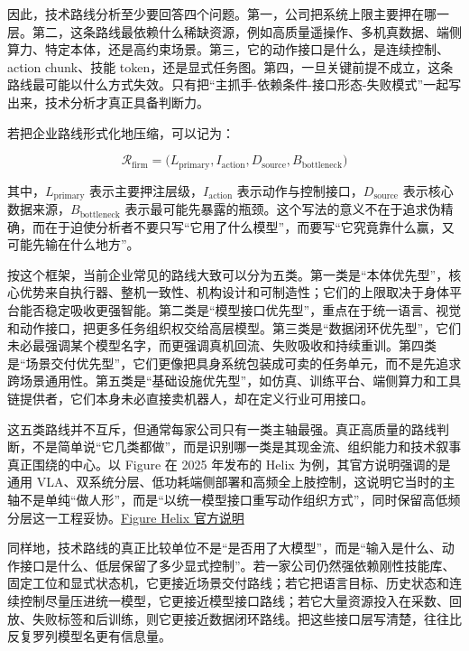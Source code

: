 因此，技术路线分析至少要回答四个问题。第一，公司把系统上限主要押在哪一层。第二，这条路线最依赖什么稀缺资源，例如高质量遥操作、多机真数据、端侧算力、特定本体，还是高约束场景。第三，它的动作接口是什么，是连续控制、action chunk、技能 token，还是显式任务图。第四，一旦关键前提不成立，这条路线最可能以什么方式失效。只有把“主抓手-依赖条件-接口形态-失败模式”一起写出来，技术分析才真正具备判断力。

若把企业路线形式化地压缩，可以记为：

\begingroup
\scriptsize
\begin{equation*}
\mathcal{R}_{\text{firm}} = \bigl(L_{\text{primary}}, I_{\text{action}}, D_{\text{source}}, B_{\text{bottleneck}}\bigr)
\end{equation*}
\endgroup

其中，\(L_{\text{primary}}\) 表示主要押注层级，\(I_{\text{action}}\) 表示动作与控制接口，\(D_{\text{source}}\) 表示核心数据来源，\(B_{\text{bottleneck}}\) 表示最可能先暴露的瓶颈。这个写法的意义不在于追求伪精确，而在于迫使分析者不要只写“它用了什么模型”，而要写“它究竟靠什么赢，又可能先输在什么地方”。

按这个框架，当前企业常见的路线大致可以分为五类。第一类是“本体优先型”，核心优势来自执行器、整机一致性、机构设计和可制造性；它们的上限取决于身体平台能否稳定吸收更强智能。第二类是“模型接口优先型”，重点在于统一语言、视觉和动作接口，把更多任务组织权交给高层模型。第三类是“数据闭环优先型”，它们未必最强调某个模型名字，而更强调真机回流、失败吸收和持续重训。第四类是“场景交付优先型”，它们更像把具身系统包装成可卖的任务单元，而不是先追求跨场景通用性。第五类是“基础设施优先型”，如仿真、训练平台、端侧算力和工具链提供者，它们本身未必直接卖机器人，却在定义行业可用接口。

这五类路线并不互斥，但通常每家公司只有一类主轴最强。真正高质量的路线判断，不是简单说“它几类都做”，而是识别哪一类是其现金流、组织能力和技术叙事真正围绕的中心。以 Figure 在 2025 年发布的 Helix 为例，其官方说明强调的是通用 VLA、双系统分层、低功耗端侧部署和高频全上肢控制，这说明它当时的主轴不是单纯“做人形”，而是“以统一模型接口重写动作组织方式”，同时保留高低频分层这一工程妥协。\href{https://www.figure.ai/news/helix}{Figure Helix 官方说明}

同样地，技术路线的真正比较单位不是“是否用了大模型”，而是“输入是什么、动作接口是什么、低层保留了多少显式控制”。若一家公司仍然强依赖刚性技能库、固定工位和显式状态机，它更接近场景交付路线；若它把语言目标、历史状态和连续控制尽量压进统一模型，它更接近模型接口路线；若它大量资源投入在采数、回放、失败标签和后训练，则它更接近数据闭环路线。把这些接口层写清楚，往往比反复罗列模型名更有信息量。

